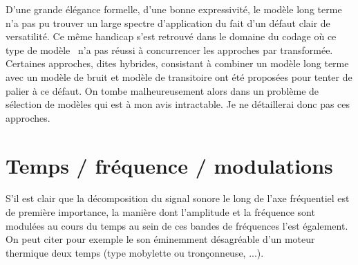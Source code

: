 D'une grande élégance formelle, d'une bonne expressivité, le modèle long terme n'a pas pu trouver un large spectre d'application du fait d'un défaut clair de versatilité. Ce même handicap s'est retrouvé dans le domaine du codage où ce type de modèle~\cite{den2002parametric} n'a pas réussi à concurrencer les approches par transformée. Certaines approches, dites hybrides, consistant à combiner un modèle long terme avec un modèle de bruit et modèle de transitoire ont été proposées pour tenter de palier à ce défaut. On tombe malheureusement alors dans un problème de sélection de modèles qui est à mon avis intractable. Je ne détaillerai donc pas ces approches.



\section{ \nmu Temps / fréquence / modulations}  \label{sec:tfm}

S'il est clair que la décomposition du signal sonore le long de l'axe fréquentiel est de première importance, la manière dont l'amplitude et la fréquence sont modulées au cours du temps au sein de ces bandes de fréquences l'est également. On peut citer pour exemple le son éminemment désagréable d'un moteur thermique deux temps (type mobylette ou tronçonneuse, ...).


